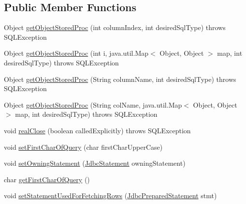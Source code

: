 \subsection*{Public Member Functions}
\begin{DoxyCompactItemize}
\item 
Object \mbox{\hyperlink{interfacecom_1_1mysql_1_1cj_1_1jdbc_1_1result_1_1_result_set_internal_methods_a2a06ef27f3e32523ff5d6b8e04f7586b}{get\+Object\+Stored\+Proc}} (int column\+Index, int desired\+Sql\+Type)  throws S\+Q\+L\+Exception
\item 
Object \mbox{\hyperlink{interfacecom_1_1mysql_1_1cj_1_1jdbc_1_1result_1_1_result_set_internal_methods_ab099352f36bb8af21d47fbfebe9a515a}{get\+Object\+Stored\+Proc}} (int i, java.\+util.\+Map$<$ Object, Object $>$ map, int desired\+Sql\+Type)  throws S\+Q\+L\+Exception
\item 
Object \mbox{\hyperlink{interfacecom_1_1mysql_1_1cj_1_1jdbc_1_1result_1_1_result_set_internal_methods_a403c7181f28d44398e8ba4865edf8fb0}{get\+Object\+Stored\+Proc}} (String column\+Name, int desired\+Sql\+Type)  throws S\+Q\+L\+Exception
\item 
Object \mbox{\hyperlink{interfacecom_1_1mysql_1_1cj_1_1jdbc_1_1result_1_1_result_set_internal_methods_a435054bb5cb1913347350cbbb21fa591}{get\+Object\+Stored\+Proc}} (String col\+Name, java.\+util.\+Map$<$ Object, Object $>$ map, int desired\+Sql\+Type)  throws S\+Q\+L\+Exception
\item 
void \mbox{\hyperlink{interfacecom_1_1mysql_1_1cj_1_1jdbc_1_1result_1_1_result_set_internal_methods_a0102042bd0710772308db537f40e2286}{real\+Close}} (boolean called\+Explicitly)  throws S\+Q\+L\+Exception
\item 
void \mbox{\hyperlink{interfacecom_1_1mysql_1_1cj_1_1jdbc_1_1result_1_1_result_set_internal_methods_a0cf0d8b631bb6bc7a7453ee35399889f}{set\+First\+Char\+Of\+Query}} (char first\+Char\+Upper\+Case)
\item 
void \mbox{\hyperlink{interfacecom_1_1mysql_1_1cj_1_1jdbc_1_1result_1_1_result_set_internal_methods_aaa893384996564b579f90c25c1c0e8c1}{set\+Owning\+Statement}} (\mbox{\hyperlink{interfacecom_1_1mysql_1_1cj_1_1jdbc_1_1_jdbc_statement}{Jdbc\+Statement}} owning\+Statement)
\item 
char \mbox{\hyperlink{interfacecom_1_1mysql_1_1cj_1_1jdbc_1_1result_1_1_result_set_internal_methods_ab58d42f08a9145dcff574389fcb697ff}{get\+First\+Char\+Of\+Query}} ()
\item 
void \mbox{\hyperlink{interfacecom_1_1mysql_1_1cj_1_1jdbc_1_1result_1_1_result_set_internal_methods_ae1258b1e6de19952cd438a340122cc81}{set\+Statement\+Used\+For\+Fetching\+Rows}} (\mbox{\hyperlink{interfacecom_1_1mysql_1_1cj_1_1jdbc_1_1_jdbc_prepared_statement}{Jdbc\+Prepared\+Statement}} stmt)

\end{DoxyCompactItemize}

